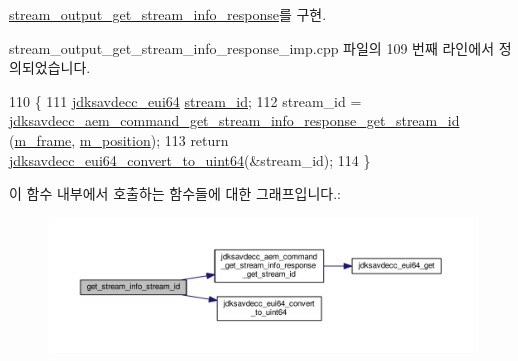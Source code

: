 \hyperlink{classavdecc__lib_1_1stream__output__get__stream__info__response_a075bc859c84291de462603064f31dd06}{stream\+\_\+output\+\_\+get\+\_\+stream\+\_\+info\+\_\+response}를 구현.



stream\+\_\+output\+\_\+get\+\_\+stream\+\_\+info\+\_\+response\+\_\+imp.\+cpp 파일의 109 번째 라인에서 정의되었습니다.


\begin{DoxyCode}
110 \{
111     \hyperlink{structjdksavdecc__eui64}{jdksavdecc\_eui64} \hyperlink{avtp_8h_af5af7b461263e29ceb91a8d3a8bc2c97}{stream\_id};
112     stream\_id = \hyperlink{group__command__get__stream__info__response_ga4f291b37baae43a9121c4a9cd97ce4ca}{jdksavdecc\_aem\_command\_get\_stream\_info\_response\_get\_stream\_id}
      (\hyperlink{classavdecc__lib_1_1stream__output__get__stream__info__response__imp_a50417969cf438e7c8d698726bbbe2ff9}{m\_frame}, \hyperlink{classavdecc__lib_1_1stream__output__get__stream__info__response__imp_af5e691c4a8a0feb07f48440b321206cd}{m\_position});
113     \textcolor{keywordflow}{return} \hyperlink{group__eui64_ga1c9a3634faa4bec90dea5a52e691bf63}{jdksavdecc\_eui64\_convert\_to\_uint64}(&stream\_id);
114 \}
\end{DoxyCode}


이 함수 내부에서 호출하는 함수들에 대한 그래프입니다.\+:
\nopagebreak
\begin{figure}[H]
\begin{center}
\leavevmode
\includegraphics[width=350pt]{classavdecc__lib_1_1stream__output__get__stream__info__response__imp_af3936cefa1b1b6de8c200f2cb0d0ff32_cgraph}
\end{center}
\end{figure}


